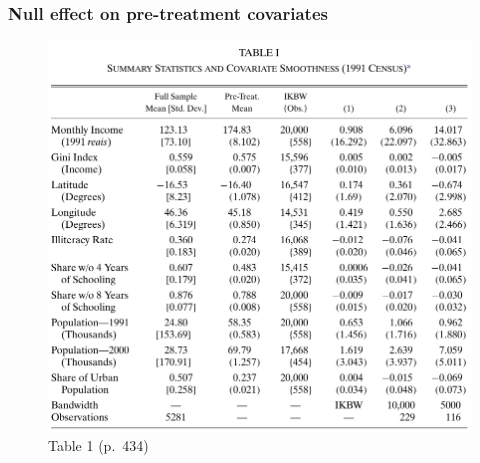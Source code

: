\documentclass[12pt,english,dvipsnames,aspectratio=169,handout]{beamer}\usepackage[]{graphicx}\usepackage[]{xcolor}
\begin{document}
\begin{frame}
\frametitle{Null effect on pre-treatment covariates}

\begin{figure}
\centering
\includegraphics[scale=0.3]{../04-figures/07/21.PNG}
\caption{Table 1 (p.~434)}
\end{figure}

\end{frame}
\end{document}
